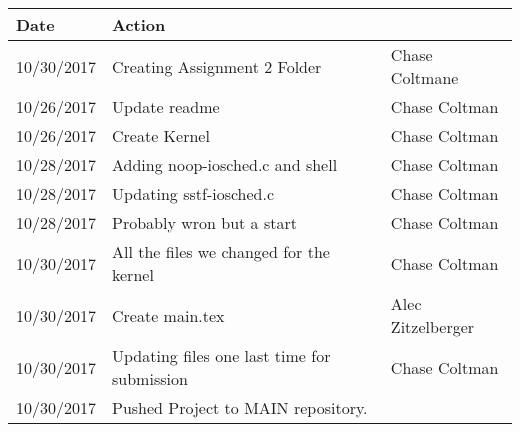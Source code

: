 \documentclass[journal,10pt,onecolumn,compsoc]{IEEEtran} \usepackage[margin=1.0in]{geometry} \usepackage{pdfpages}
\begin{document}
\begin{table}
  \begin{tabular}{|l|l|l|}
  \hline
  Date & Action \\ \hline
 10/30/2017 & Creating Assignment 2 Folder & Chase Coltmane \\ 
 10/26/2017  & Update readme & Chase Coltman \\ 
 10/26/2017 & Create Kernel & Chase Coltman \\ 
 10/28/2017 & Adding noop-iosched.c and shell & Chase Coltman \\ 
 10/28/2017 & Updating sstf-iosched.c & Chase Coltman \\ 
 10/28/2017 & Probably wron but a start & Chase Coltman \\ 
 10/30/2017 & All the files we changed for the kernel & Chase Coltman \\ 
 10/30/2017 & Create main.tex & Alec Zitzelberger \\ 
 10/30/2017 & Updating files one last time for submission & Chase Coltman \\ 
 10/30/2017 & Pushed Project to MAIN repository. \\
  \hline
  \end{tabular}
  \end{table}

 
\end{document}
